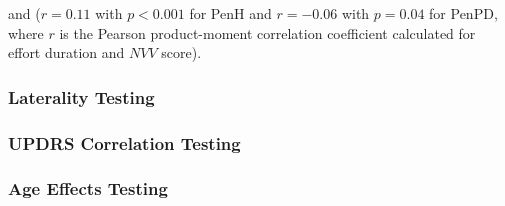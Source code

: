 and ($r=0.11$ with $p<0.001$ for \gls{PenH} and $r= -0.06$ with $p=0.04$ for \gls{PenPD}, where $r$ is the Pearson product-moment correlation coefficient calculated for effort duration and $NVV$ score). 

\subsubsection{Laterality Testing}
\label{subsubsec:PenCTLateralityTesting}

\subsubsection{UPDRS Correlation Testing}
\label{subsubsec:PenCTUPDRSCorTesting}

\subsubsection{Age Effects Testing}
\label{subsubsec:PenCTAgeEffectsTesting}

